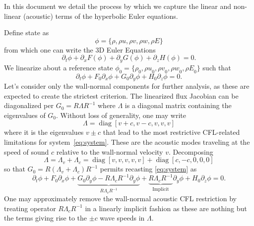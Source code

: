 \documentclass[letterpaper,11pt,nointlimits,reqno]{amsart}
\begin{document}
In this document we detail the process by which we capture the linear
and non-linear (acoustic) terms of the hyperbolic Euler equations.

Define state as
\begin{equation}
 \phi = \{\rho, \rho u, \rho v, \rho w, \rho E \}
\end{equation}
from which one can write the 3D Euler Equations
\begin{equation}
 \partial_t \phi + \partial_x F(\phi) + \partial_y G(\phi) + \partial_z
  H(\phi) = 0
  .
\end{equation}
We linearize about a reference state $\phi_0 = \{\rho_0, {\rho u}_0,
{\rho v}_0, {\rho w}_0, {\rho E}_0 \}$ such that
\begin{equation}\label{eq:system}
 \partial_t \phi +  F_0 \partial_x \phi + G_0 \partial_y \phi + H_0 \partial_z
  \phi = 0
  .
\end{equation}
Let's consider only the wall-normal components for further analysis, as these
are expected to create the strictest criterion.  The linearized flux Jacobian
can be diagonalized per $G_0 = R \Lambda R^{-1}$ where $\Lambda$ is a diagonal
matrix containing the eigenvalues of $G_0$.  Without loss of generality, one
may write
\begin{equation}
  \Lambda = \operatorname{diag}\left[v+c,v-c,v,v,v\right]
\end{equation}
where it is the eigenvalues $v\pm{}c$ that lead to the most restrictive
CFL-related limitations for system~\eqref{eq:system}.  These are the acoustic
modes traveling at the speed of sound $c$ relative to the wall-normal velocity
$v$.  Decomposing
\begin{equation}
  \Lambda = \Lambda_v + \Lambda_c =
  \operatorname{diag}\left[v,v,v,v,v\right]
  +
  \operatorname{diag}\left[c,-c,0,0,0\right]
\end{equation}
so that $ G_0 = R \left(\Lambda_v + \Lambda_c\right) R^{-1} $ permits recasting
\eqref{eq:system} as
\begin{equation}
    \partial_t \phi
 +  F_0 \partial_x \phi
 +  \underbrace{
      G_0 \partial_y \phi - R \Lambda_c R^{-1} \partial_y \phi
    }_{R \Lambda_v R^{-1}}
 +  \underbrace{R \Lambda_c R^{-1}}_{\text{Implicit}} \partial_y \phi
 +  H_0 \partial_z \phi
  = 0
  .
\end{equation}
One may approximately remove the wall-normal acoustic CFL restriction by
treating operator $R \Lambda_c R^{-1}$ in a linearly implicit fashion as these
are nothing but the terms giving rise to the $\pm{}c$ wave speeds in $\Lambda$.
\end{document}
